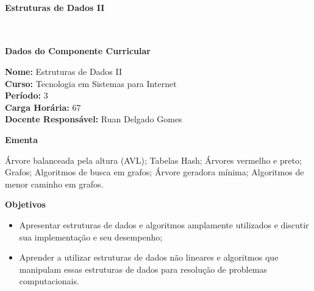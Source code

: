 \paragraph{Estruturas de Dados II} \


\begin{snugshade}\begin{center}\textbf{
    Dados do Componente Curricular
}\end{center}\end{snugshade}

\noindent \textbf{Nome:}                Estruturas de Dados II
\\        \textbf{Curso:}               Tecnologia em Sistemas para Internet
\\        \textbf{Período:}             \unit{3}{\degree}
\\        \textbf{Carga Horária:}       \unit{67}{\hour}
\\        \textbf{Docente Responsável:} Ruan Delgado Gomes


\begin{snugshade}\begin{center}\textbf{
    Ementa
\vphantom{q}}\end{center}\end{snugshade}

\noindent
\'Arvore balanceada pela altura (AVL); Tabelas Hash; \'Arvores vermelho e preto; Grafos; Algoritmos de busca em grafos; \'Arvore geradora m\'inima; Algoritmos de menor caminho em grafos.


\begin{snugshade}\begin{center}\textbf{
    Objetivos
}\end{center}\end{snugshade}

\begin{itemize}

\item Apresentar estruturas de dados e algoritmos amplamente utilizados e discutir sua implementação e seu desempenho;

\item Aprender a utilizar estruturas de dados n\~ao lineares e algoritmos que manipulam essas estruturas de dados para resolu\c{c}\~ao de problemas computacionais.

\end{itemize} 

